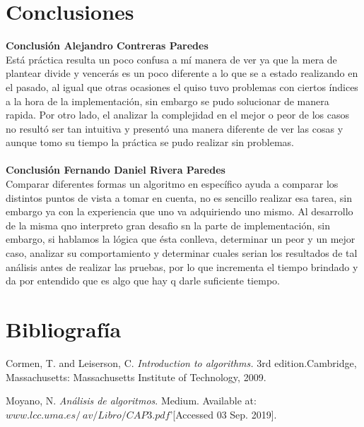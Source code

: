 \documentclass[12pt,twoside]{article}
\begin{document}
\section{Conclusiones}
\textbf{Conclusión Alejandro Contreras Paredes}\\
Está práctica resulta un poco confusa a mí manera de ver ya que la mera de plantear divide y vencerás es un poco diferente a lo que se a estado realizando en 
el pasado, al igual que otras ocasiones el quiso tuvo problemas con ciertos índices a la hora de la implementación, sin embargo se pudo solucionar de manera rapida. 
Por otro lado, el analizar la complejidad en el mejor o peor de los casos no resultó ser tan intuitiva y presentó una manera diferente de ver las cosas y aunque 
tomo su tiempo la práctica se pudo realizar sin problemas.\\\\
\textbf{Conclusión Fernando Daniel Rivera Paredes}\\
Comparar diferentes formas un algoritmo en específico ayuda a comparar los distintos puntos de vista a tomar en cuenta, no es sencillo realizar esa tarea, sin embargo
ya con la experiencia que uno va adquiriendo uno mismo. Al desarrollo de la misma qno interpreto gran desafio sn la parte de implementación, sin embargo, si hablamos
la lógica que ésta conlleva, determinar un peor y un mejor caso, analizar su comportamiento y determinar cuales serian los resultados de tal análisis antes de realizar
las pruebas, por lo que incrementa el tiempo brindado y da por entendido que es algo que hay q darle suficiente tiempo.

\section{Bibliograf\'ia}

\begin{thebibliography}{9}
  Cormen, T. and Leiserson, C.
  \textit{Introduction to algorithms.} 
  3rd edition.Cambridge, Massachusetts: Massachusetts Institute of Technology, 2009.

  Moyano, N.
  \textit{Análisis de algoritmos}.
  Medium. Available at: $www.lcc.uma.es/~av/Libro/CAP3.pdf$'[Accessed 03 Sep. 2019].
\end{thebibliography}
\end{document}

